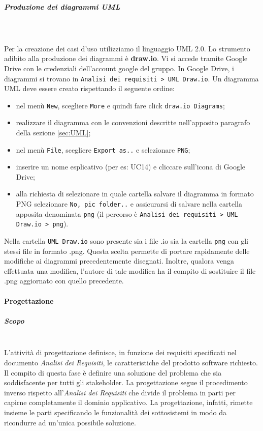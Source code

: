 			
			\subparagraph*{Produzione dei diagrammi UML} \mbox{}\\ \mbox{}\\
			Per la creazione dei casi d'uso utilizziamo il linguaggio UML 2.0.
			Lo strumento adibito alla produzione dei diagrammi è \textbf{draw.io}.
			Vi si accede tramite Google Drive con le credenziali dell'account google del gruppo.
			In Google Drive, i diagrammi si trovano in \texttt{Analisi dei requisiti > UML Draw.io}.
			Un diagramma UML deve essere creato rispettando il seguente ordine:
			\begin{itemize}
				\item nel menù \texttt{New}, scegliere \texttt{More} e quindi fare
				click \texttt{draw.io Diagrams};
				\item realizzare il diagramma con le convenzioni descritte nell'apposito
				paragrafo della sezione \ref{sec:UML}; 
				\item nel menù \texttt{File}, scegliere \texttt{Export as..} e selezionare \texttt{PNG};
				\item inserire un nome esplicativo (per es: UC14) e cliccare sull'icona di
				Google Drive;
				\item alla richiesta di selezionare in quale cartella salvare il diagramma 
				in formato PNG selezionare \texttt{No, pic folder..} e assicurarsi di salvare 
				nella cartella apposita denominata \texttt{png} (il percorso è 
				\texttt{Analisi dei requisiti > UML Draw.io > png}).
			\end{itemize}
			Nella cartella \texttt{UML Draw.io} sono presente sia i file .io sia la cartella \texttt{png} con gli stessi file in formato .png.
			Questa scelta permette di portare rapidamente delle modifiche ai diagrammi precedentemente disegnati.
			Inoltre, qualora venga effettuata una modifica, l'autore di tale modifica ha il compito di sostituire il file .png aggiornato con quello precedente. 
					
		\paragraph{Progettazione} 
			\subparagraph*{Scopo} \mbox{}\\
			
			\noindent L'attività di progettazione definisce, in funzione dei requisiti specificati 
			nel documento \textit{Analisi dei Requisiti}, le caratteristiche del prodotto 
			software richiesto. Il compito di questa fase è definire una soluzione del 
			problema che sia soddisfacente per tutti gli stakeholder. La progettazione segue 
			il procedimento inverso rispetto all'\textit{Analisi dei Requisiti} che divide 
			il problema in parti per capirne completamente il dominio applicativo. La 
			progettazione, infatti, rimette insieme le parti specificando le funzionalità 
			dei sottosistemi in modo da ricondurre ad un'unica possibile soluzione. \newline 
			

